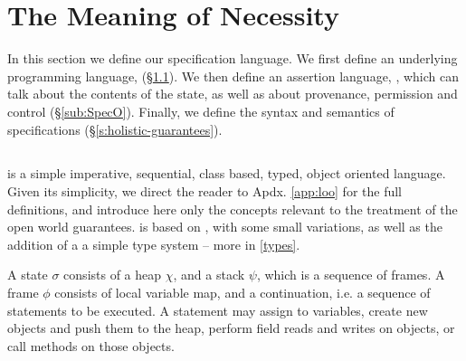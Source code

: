 \section{The Meaning of Necessity}
\label{s:semantics}

 
In this section we define our \Nec specification language.
We first define 
an underlying programming language, \Loo  (\S \ref{sub:Loo}).
We then  define an assertion language, \SpecO,  which can talk about
 the contents of the state, as well as about
provenance, permission and control (\S \ref{sub:SpecO}).
Finally, we define the syntax and semantics of 
\Nec specifications  (\S \ref{s:holistic-guarantees}).


\subsection{\Loo}
\label{sub:Loo} 
 \Loo is a  simple  imperative, sequential, 
class based, typed, object oriented language.
 Given its simplicity, %
 we direct the reader to Apdx. \ref{app:loo} for 
the full definitions, and introduce here only %
 the concepts relevant to the
treatment of the open world guarantees.
\Loo is based on \LangOO 
\cite{FASE}, with some small variations, as well as 
the addition of a %
 a simple type system -- more in \ref{types}.


A \Loo state $\sigma$ consists of a 
heap $\chi$, and a  {stack $\psi$, which is a sequence of frames}.
A frame $\phi$ consists of
local variable map, and a continuation, i.e. a sequence of statements to be executed.
 A statement may assign to variables, create new objects and push them to the heap, 
perform field reads and writes on objects,  or
 call methods on those objects. 

